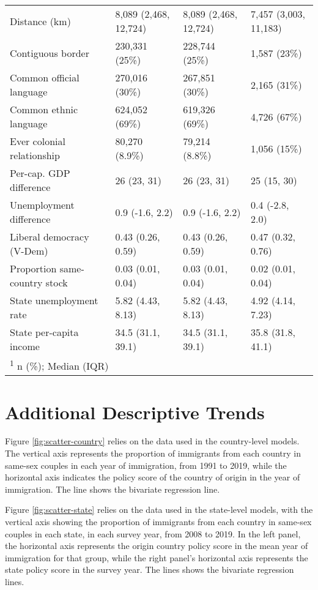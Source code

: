 \documentclass[
  11pt,
]{article}
\begin{document}
\begin{table}[!h]
\begin{tabular}[t]{llll}
Distance (km) & 8,089 (2,468, 12,724) & 8,089 (2,468, 12,724) & 7,457 (3,003, 11,183)\\
Contiguous border & 230,331 (25\%) & 228,744 (25\%) & 1,587 (23\%)\\
\addlinespace
Common official language & 270,016 (30\%) & 267,851 (30\%) & 2,165 (31\%)\\
Common ethnic language & 624,052 (69\%) & 619,326 (69\%) & 4,726 (67\%)\\
Ever colonial relationship & 80,270 (8.9\%) & 79,214 (8.8\%) & 1,056 (15\%)\\
Per-cap. GDP difference & 26 (23, 31) & 26 (23, 31) & 25 (15, 30)\\
Unemployment difference & 0.9 (-1.6, 2.2) & 0.9 (-1.6, 2.2) & 0.4 (-2.8, 2.0)\\
\addlinespace
Liberal democracy (V-Dem) & 0.43 (0.26, 0.59) & 0.43 (0.26, 0.59) & 0.47 (0.32, 0.76)\\
Proportion same-country stock & 0.03 (0.01, 0.04) & 0.03 (0.01, 0.04) & 0.02 (0.01, 0.04)\\
State unemployment rate & 5.82 (4.43, 8.13) & 5.82 (4.43, 8.13) & 4.92 (4.14, 7.23)\\
State per-capita income & 34.5 (31.1, 39.1) & 34.5 (31.1, 39.1) & 35.8 (31.8, 41.1)\\
\bottomrule
\multicolumn{4}{l}{\rule{0pt}{1em}\textsuperscript{1} n (\%); Median (IQR)}\\
\end{tabular}
\end{table}

\newpage

\hypertarget{additional-descriptive-trends}{%
\section{Additional Descriptive Trends}\label{additional-descriptive-trends}}

Figure \ref{fig:scatter-country} relies on the data used in the country-level models. The vertical axis represents the proportion of immigrants from each country in same-sex couples in each year of immigration, from 1991 to 2019, while the horizontal axis indicates the policy score of the country of origin in the year of immigration. The line shows the bivariate regression line.

Figure \ref{fig:scatter-state} relies on the data used in the state-level models, with the vertical axis showing the proportion of immigrants from each country in same-sex couples in each state, in each survey year, from 2008 to 2019. In the left panel, the horizontal axis represents the origin country policy score in the mean year of immigration for that group, while the right panel's horizontal axis represents the state policy score in the survey year. The lines shows the bivariate regression lines.
\end{document}
